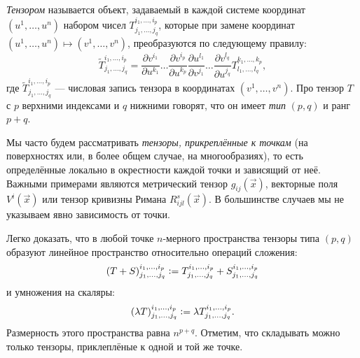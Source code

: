 \begin{definition}
	\textit{Тензором} называется объект, задаваемый в каждой системе координат $(u^1, \ldots, u^n)$ набором чисел $T^{i_1, \ldots, i_p}_{j_1, \ldots, j_q}$, которые при замене координат $(u^1, \ldots, u^n) \mapsto (v^1, \ldots, v^n)$, преобразуются по следующему правилу:
	\[
		\widetilde{T}^{i_1, \ldots, i_p}_{j_1, \ldots, j_q} = \frac{\partial v^{i_1}}{\partial u^{k_1}} \ldots \frac{\partial v^{i_p}}{\partial u^{k_p}}\frac{\partial u^{l_1}}{\partial v^{j_1}} \ldots \frac{\partial v^{l_q}}{\partial u^{j_q}}T^{k_1, \ldots, k_p}_{l_1, \ldots, l_q},
	\]
	где $\widetilde{T}^{i_1, \ldots, i_p}_{j_1, \ldots, j_q}$ --- числовая запись тензора в координатах $(v^1, \ldots, v^n)$. Про тензор $T$ с $p$ верхними индексами и $q$ нижними говорят, что он имеет \textit{тип} $(p, q)$ и ранг $p + q$.
\end{definition}

Мы часто будем рассматривать \textit{тензоры, прикреплённые к точкам} (на поверхностях или, в более общем случае, на многообразиях), то есть определённые локально в окрестности каждой точки и зависящий от неё. Важными примерами являются метрический тензор $g_{ij}(\vec{x})$, векторные поля $V^i(\vec{x})$ или тензор кривизны Римана $R^s_{ijl}(\vec{x})$. В большинстве случаев мы не указываем явно зависимость от точки.

Легко доказать, что в любой точке $n$-мерного пространства тензоры типа $(p, q)$ образуют линейное пространство относительно операций сложения:
\[
	(T + S)^{i_1, \ldots, i_p}_{j_1, \ldots, j_q} \vcentcolon = T^{i_1, \ldots, i_p}_{j_1, \ldots, j_q} + S^{i_1, \ldots, i_p}_{j_1, \ldots, j_q}
\]
и умножения на скаляры:
\[
	(\lambda T)^{i_1, \ldots, i_p}_{j_1, \ldots, j_q} \vcentcolon = \lambda T^{i_1, \ldots, i_p}_{j_1, \ldots, j_q}.
\]
Размерность этого пространства равна $n^{p + q}$. Отметим, что складывать можно только тензоры, приклеплёные к одной и той же точке.

